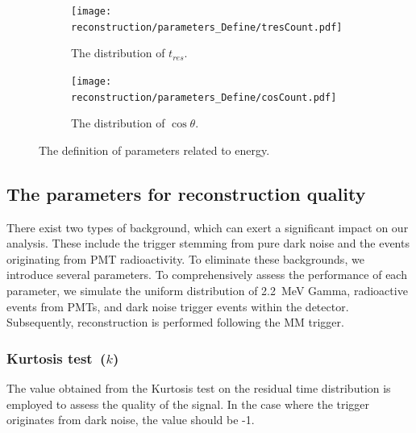 \begin{figure}[htbp]
	\centering
	\begin{subfigure}{0.5\textwidth}
		\centering
		\texttt{[image: reconstruction/parameters\_Define/tresCount.pdf]}
		\caption{The distribution of $t_{res}$.}
		\label{fig:n20def}
	\end{subfigure}%
	\begin{subfigure}{0.5\textwidth}
		\centering
		\texttt{[image: reconstruction/parameters\_Define/cosCount.pdf]}
		\caption{The distribution of $\cos\theta$.}
		\label{fig:nc}
	\end{subfigure}
	\caption{The definition of parameters related to energy.}
	\label{fig:dual}
\end{figure}

\subsection{The parameters for reconstruction quality}
There exist two types of background, which can exert a significant impact on our analysis. These include the trigger stemming from pure dark noise and the events originating from PMT radioactivity. To eliminate these backgrounds, we introduce several parameters. To comprehensively assess the performance of each parameter, we simulate the uniform distribution of \SI{2.2}{MeV} Gamma, radioactive events from PMTs, and dark noise trigger events within the detector. Subsequently, reconstruction is performed following the MM trigger.

\subsubsection{Kurtosis test~($k$)}
The value obtained from the Kurtosis test on the residual time distribution is employed to assess the quality of the signal. In the case where the trigger originates from dark noise, the value should be -1.

